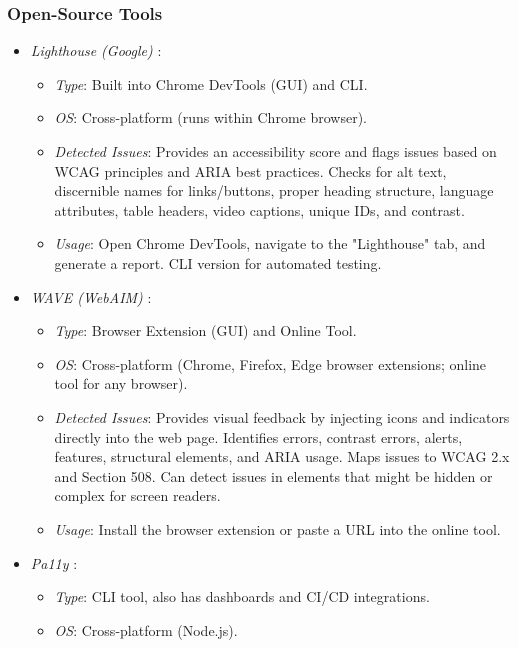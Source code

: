 \subsubsection{Open-Source Tools}
\label{subsubsec:web-open-source-tools}
\begin{itemize}
    \item \emph{Lighthouse (Google)} \cite{lighthouse}:
        \begin{itemize}
            \item \emph{Type}: Built into Chrome DevTools (GUI) and CLI.
            \item \emph{OS}: Cross-platform (runs within Chrome browser).
            \item \emph{Detected Issues}: Provides an accessibility score and flags issues based on WCAG principles and ARIA best practices. Checks for alt text, discernible names for links/buttons, proper heading structure, language attributes, table headers, video captions, unique IDs, and contrast.
            \item \emph{Usage}: Open Chrome DevTools, navigate to the "Lighthouse" tab, and generate a report. CLI version for automated testing.
        \end{itemize}
    \item \emph{WAVE (WebAIM)} \cite{wavewebaim}:
        \begin{itemize}
            \item \emph{Type}: Browser Extension (GUI) and Online Tool.
            \item \emph{OS}: Cross-platform (Chrome, Firefox, Edge browser extensions; online tool for any browser).
            \item \emph{Detected Issues}: Provides visual feedback by injecting icons and indicators directly into the web page. Identifies errors, contrast errors, alerts, features, structural elements, and ARIA usage. Maps issues to WCAG 2.x and Section 508. Can detect issues in elements that might be hidden or complex for screen readers.
            \item \emph{Usage}: Install the browser extension or paste a URL into the online tool.
        \end{itemize}
    \item \emph{Pa11y} \cite{pa11y}:
        \begin{itemize}
            \item \emph{Type}: CLI tool, also has dashboards and CI/CD integrations.
            \item \emph{OS}: Cross-platform (Node.js).

\end{itemize}
\end{itemize}
